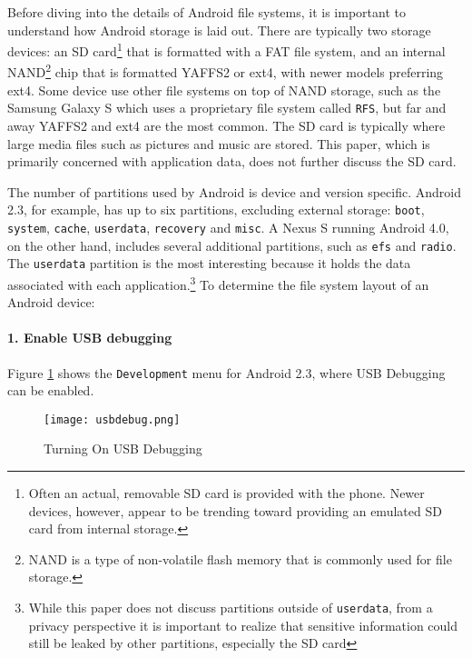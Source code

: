 Before diving into the details of Android file systems, it is important to understand how Android storage is laid out.  There are
typically two storage devices: an SD card\footnote{Often an actual, removable SD card is provided with the phone. Newer devices,
however, appear to be trending toward providing an emulated SD card from internal storage.} that is formatted with a FAT file
system, and an internal NAND\footnote{NAND is a type of non-volatile flash memory that is commonly used for file storage.} chip that
is formatted YAFFS2 or ext4, with newer models preferring ext4. Some device use other file systems on top
of NAND storage, such as the Samsung Galaxy S which uses a proprietary file system called \texttt{RFS}, but far and away
YAFFS2 and ext4 are the most common. The SD card is typically where large media files such as pictures and music
are stored. This paper, which is primarily concerned with application data, does not further discuss the SD card.

The number of partitions used by Android is device and version specific.  Android 2.3, for example, has up to six partitions,
excluding external storage: \texttt{boot}, \texttt{system}, \texttt{cache}, \texttt{userdata}, \texttt{recovery} and \texttt{misc}.
A Nexus S running Android 4.0, on the other hand, includes several additional partitions, such as \texttt{efs} and \texttt{radio}.
The \texttt{userdata} partition is the most interesting because it holds the data associated with each application.\footnote{
While this paper does not discuss partitions outside of \texttt{userdata}, from a privacy perspective it is important to realize
that sensitive information could still be leaked by other partitions, especially the SD card} To determine the file system layout
of an Android device:

\paragraph {1. Enable USB debugging} 
Figure \ref{fig:usbdebug} shows the \texttt{Development} menu for Android 2.3, where USB Debugging can be
enabled.  
\begin{figure}[htb]
\begin{center}\texttt{[image: usbdebug.png]}\end{center}
\caption{Turning On USB Debugging}
\label{fig:usbdebug}
\end{figure}

